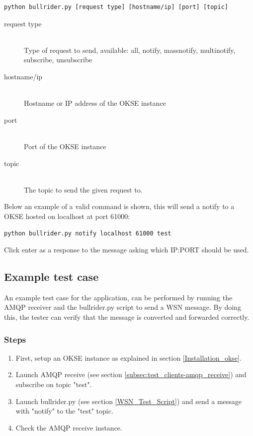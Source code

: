 \begin{verbatim}
python bullrider.py [request type] [hostname/ip] [port] [topic]
\end{verbatim}


\begin{description}
    \item[request type] \hfill \\
  Type of request to send, available: all, notify, massnotify, multinotify, subscribe, unsubscribe \hfill 
    \item[hostname/ip] \hfill \\
  Hostname or IP address of the OKSE instance \hfill 
    \item[port] \hfill \\
  Port of the OKSE instance \hfill 
    \item[topic] \hfill \\
  The topic to send the given request to. \hfill 
\end{description}
Below an example of a valid command is shown, this will send a notify to a OKSE hosted on localhost at port 61000:

\begin{verbatim}
python bullrider.py notify localhost 61000 test
\end{verbatim}
Click enter as a response to the message asking which IP:PORT should be used.

\subsection{Example test case}

An example test case for the application, can be performed by running the AMQP receiver and the bullrider.py script to send a WSN message. By doing this, the tester can verify that the message is converted and forwarded correctly.

\subsubsection{Steps}
\begin{enumerate}
\item First, setup an OKSE instance as explained in section  \ref{Installation_okse}. 
\item Launch AMQP receive (see section \ref{subsec:test_clients-amqp_receive}) and subscribe on topic "test". 
\item Launch bullrider.py (see section \ref{WSN_Test_Script}) and send a message with "notify" to the "test" topic. 
\item Check the AMQP receive instance.
\end{enumerate}


\clearpage